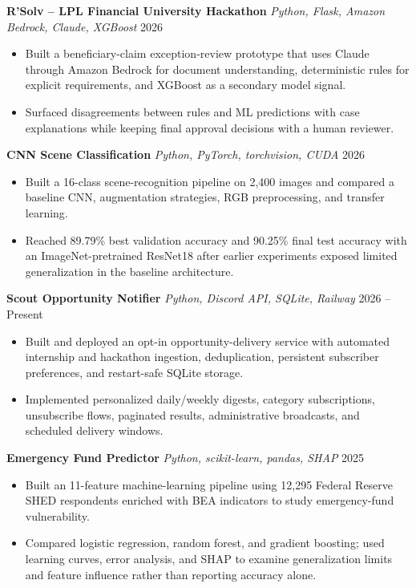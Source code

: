 \documentclass[letterpaper,10pt]{article}
\newcommand{\projectentry}[3]{
  \noindent\textbf{#1} \textbar{} \textit{#2} \hfill #3
}
\begin{document}
\smallskip

\projectentry
  {R'Solv -- LPL Financial University Hackathon}
  {Python, Flask, Amazon Bedrock, Claude, XGBoost}
  {2026}
\begin{itemize}
  \item Built a beneficiary-claim exception-review prototype that uses Claude through Amazon Bedrock for document understanding, deterministic rules for explicit requirements, and XGBoost as a secondary model signal.
  \item Surfaced disagreements between rules and ML predictions with case explanations while keeping final approval decisions with a human reviewer.
\end{itemize}

\smallskip

\projectentry
  {CNN Scene Classification}
  {Python, PyTorch, torchvision, CUDA}
  {2026}
\begin{itemize}
  \item Built a 16-class scene-recognition pipeline on 2,400 images and compared a baseline CNN, augmentation strategies, RGB preprocessing, and transfer learning.
  \item Reached 89.79\% best validation accuracy and 90.25\% final test accuracy with an ImageNet-pretrained ResNet18 after earlier experiments exposed limited generalization in the baseline architecture.
\end{itemize}

\smallskip

\projectentry
  {Scout Opportunity Notifier}
  {Python, Discord API, SQLite, Railway}
  {2026 -- Present}
\begin{itemize}
  \item Built and deployed an opt-in opportunity-delivery service with automated internship and hackathon ingestion, deduplication, persistent subscriber preferences, and restart-safe SQLite storage.
  \item Implemented personalized daily/weekly digests, category subscriptions, unsubscribe flows, paginated results, administrative broadcasts, and scheduled delivery windows.
\end{itemize}

\smallskip

\projectentry
  {Emergency Fund Predictor}
  {Python, scikit-learn, pandas, SHAP}
  {2025}
\begin{itemize}
  \item Built an 11-feature machine-learning pipeline using 12,295 Federal Reserve SHED respondents enriched with BEA indicators to study emergency-fund vulnerability.
  \item Compared logistic regression, random forest, and gradient boosting; used learning curves, error analysis, and SHAP to examine generalization limits and feature influence rather than reporting accuracy alone.
\end{itemize}
\end{document}
